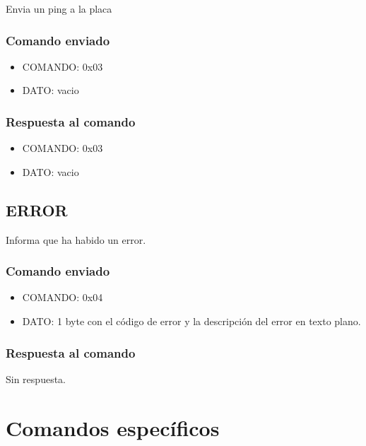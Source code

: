 \documentclass[a4paper,10pt]{article}
\begin{document}
Envia un ping a la placa

\subsubsection*{Comando enviado}
\label{ping_comando_enviado}

\begin{itemize}
	\item{COMANDO:} 0x03
	\item{DATO:} vacio
\end{itemize}

\subsubsection*{Respuesta al comando}
\label{ping_respuesta}

\begin{itemize}
	\item{COMANDO:} 0x03
	\item{DATO:} vacio
\end{itemize}

\subsection{ERROR}
\label{error}

Informa que ha habido un error.

\subsubsection*{Comando enviado}
\label{error_comando_enviado}

\begin{itemize}
	\item{COMANDO:} 0x04
	\item{DATO:} 1 byte con el c\'odigo de error y la descripci\'on del error en texto plano.
\end{itemize}

\subsubsection*{Respuesta al comando}
\label{error_respuesta}

Sin respuesta.

\section{Comandos espec\'ificos}
\label{comandos_especificos}
\end{document}
